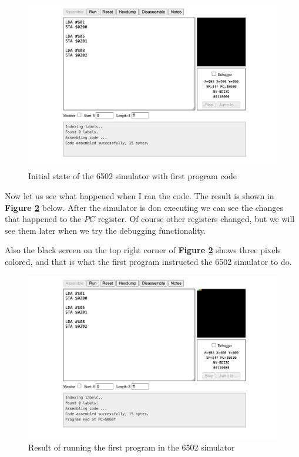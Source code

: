 \documentclass[a4paper]{article}
\begin{document}
\begin{figure}[H]
    \centering
    \includegraphics[width=1.0\textwidth]{res/images/q2/01-initial-state.png}
    \caption{Initial state of the 6502 simulator with first program code}
    \label{fig:01-initial-state}
\end{figure}

Now let us see what happened when I ran the code. The result is shown in \textbf{Figure \ref{fig:02-after-running-state}} below. After the simulator is don executing we can see the changes that happened to the $PC$ register. Of course other registers changed, but we will see them later when we try the debugging functionality.

Also the black screen on the top right corner of \textbf{Figure \ref{fig:02-after-running-state}} shows three pixels colored, and that is what the first program instructed the 6502 simulator to do.

\begin{figure}[H]
    \centering
    \includegraphics[width=1.0\textwidth]{res/images/q2/02-after-running-state.png}
    \caption{Result of running the first program in the 6502 simulator}
    \label{fig:02-after-running-state}
\end{figure}
\end{document}
